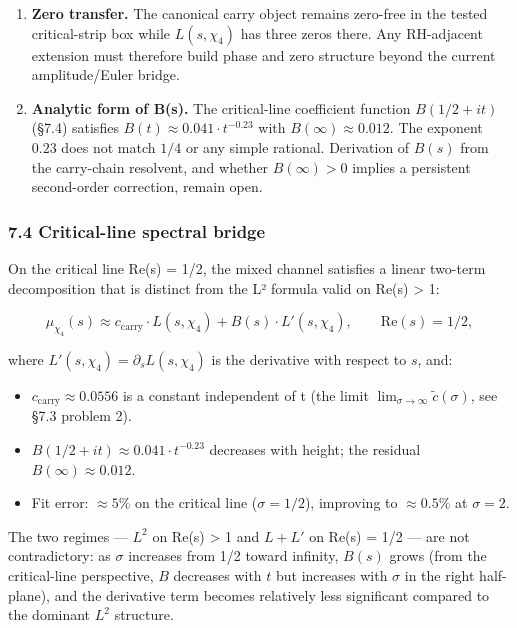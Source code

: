 \documentclass[
  11pt,
]{article}
\providecommand{\tightlist}{%
  \setlength{\itemsep}{0pt}\setlength{\parskip}{0pt}}
\begin{document}
\begin{enumerate}
  \(\Xi(s)\approx\varepsilon\,\Xi(1-s)\) on the tested grids. The missing
  completion mechanism is therefore a genuine structural problem, not a
  notational omission.
\item
  \textbf{Zero transfer.} The canonical carry object remains zero-free in the
  tested critical-strip box while \(L(s,\chi_4)\) has three zeros there. Any
  RH-adjacent extension must therefore build phase and zero structure beyond the
  current amplitude/Euler bridge.
\item
  \textbf{Analytic form of B(s).} The critical-line coefficient function
  \(B(1/2 + it)\) (§7.4) satisfies \(B(t) \approx 0.041 \cdot t^{-0.23}\) with
  \(B(\infty) \approx 0.012\). The exponent \(0.23\) does not match \(1/4\) or
  any simple rational. Derivation of \(B(s)\) from the carry-chain resolvent,
  and whether \(B(\infty) > 0\) implies a persistent second-order correction,
  remain open.
\end{enumerate}

\subsubsection{7.4 Critical-line spectral
bridge}\label{critical-line-spectral-bridge}

On the critical line Re(s) = 1/2, the mixed channel satisfies a linear two-term
decomposition that is distinct from the L² formula valid on Re(s) \textgreater{}
1:

\[\mu_{\chi_4}(s) \approx c_{\mathrm{carry}} \cdot L(s, \chi_4) + B(s) \cdot L'(s, \chi_4), \qquad \mathrm{Re}(s) = 1/2,\]

where \(L'(s, \chi_4) = \partial_s L(s, \chi_4)\) is the derivative with respect
to \(s\), and:

\begin{itemize}
\tightlist
\item
  \(c_{\mathrm{carry}} \approx 0.0556\) is a constant independent of t (the
  limit \(\lim_{\sigma\to\infty} \tilde{c}(\sigma)\), see §7.3 problem 2).
\item
  \(B(1/2 + it) \approx 0.041 \cdot t^{-0.23}\) decreases with height; the
  residual \(B(\infty) \approx 0.012\).
\item
  Fit error: \(\approx 5\%\) on the critical line (\(\sigma = 1/2\)), improving
  to \(\approx 0.5\%\) at \(\sigma = 2\).
\end{itemize}

The two regimes --- \(L^2\) on Re(s) \textgreater{} 1 and \(L + L'\) on Re(s) =
1/2 --- are not contradictory: as \(\sigma\) increases from 1/2 toward infinity,
\(B(s)\) grows (from the critical-line perspective, \(B\) decreases with \(t\)
but increases with \(\sigma\) in the right half-plane), and the derivative term
becomes relatively less significant compared to the dominant \(L^2\) structure.
\end{document}

